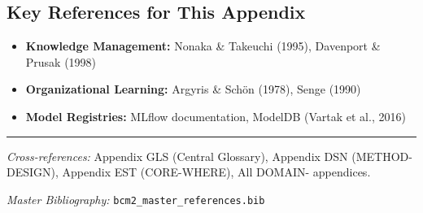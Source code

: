 \vspace{0.5em}

\subsection{Key References for This Appendix}

\begin{itemize}[nosep]
    \item \textbf{Knowledge Management:} Nonaka \& Takeuchi (1995), Davenport \& Prusak (1998)
    \item \textbf{Organizational Learning:} Argyris \& Schön (1978), Senge (1990)
    \item \textbf{Model Registries:} MLflow documentation, ModelDB (Vartak et al., 2016)
\end{itemize}

\nocite{bcm_master}



\vspace{1em}
\hrule
\vspace{0.5em}

\noindent\textit{Cross-references:}
Appendix GLS (Central Glossary),
Appendix DSN (METHOD-DESIGN),
Appendix EST (CORE-WHERE),
All DOMAIN- appendices.

\noindent\textit{Master Bibliography:} \texttt{bcm2\_master\_references.bib}



